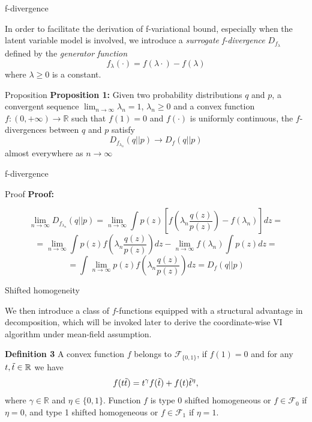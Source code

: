 \documentclass{beamer}
\begin{document}
\begin{frame}{f-divergence}
    \begin{block}{}
        In order to facilitate the derivation of f-variational bound, especially when the latent variable model is involved, we introduce a \textit{surrogate f-divergence} $D_{f_\lambda}$ defined by the \textit{generator function}
        \begin{equation}\label{f_lambda}
            f_\lambda(\cdot) = f(\lambda\cdot) - f(\lambda)
        \end{equation}
        where $\lambda \geqslant 0$ is a constant. 
    \end{block}
    \begin{block}{Proposition}
        \textbf{Proposition 1:} Given two probability distributions $q$ and $p$, a convergent sequence $\lim_{n\to\infty}\lambda_n = 1$, $\lambda_n \geqslant 0$ and a convex function $f: (0, +\infty) \rightarrow \mathbb{R}$ such that $f(1)=0$ and $f(\cdot)$ is uniformly continuous, the $f$-divergences between $q$ and $p$ satisfy
        \begin{equation}\label{prop1}
            D_{f_{\lambda_n}}(q||p) \rightarrow D_f(q||p)
        \end{equation}
        almost everywhere as $n\to\infty$
    \end{block}
\end{frame}

\begin{frame}{f-divergence}
    \begin{block}{Proof}
        \textbf{Proof:}

        $$\lim\limits_{n\to\infty}D_{f_{\lambda_n}}(q||p) = \lim\limits_{n\to\infty}\int p(z) \left[f\left(\lambda_n\dfrac{q(z)}{p(z)}\right) - f(\lambda_n)\right] dz =$$
        $$= \lim\limits_{n\to\infty}\int p(z) f\left(\lambda_n\dfrac{q(z)}{p(z)}\right)dz - \lim\limits_{n\to\infty}f(\lambda_n) \int p(z)dz =$$
        $$= \int \lim\limits_{n\to\infty} p(z) f\left(\lambda_n\dfrac{q(z)}{p(z)}\right)dz = D_f(q||p)$$
    \end{block}
\end{frame}

\begin{frame}{Shifted homogeneity}
    \begin{block}{}
        We then introduce a class of $f$-functions equipped with a structural advantage in decomposition, which will be invoked later to derive the coordinate-wise VI algorithm under mean-field assumption.

        \textbf{Definition 3} A convex function $f$ belongs to $\mathcal{F}_{\{0, 1\}}$, if $f(1)=0$ and for any $t, \Tilde{t} \in \mathbb{R}$ we have
        \begin{equation}\label{def3}
            f(t\Tilde{t}) = t^\gamma f(\Tilde{t}) + f(t)\Tilde{t}^\eta,
        \end{equation}
        where $\gamma\in\mathbb{R}$ and $\eta\in\{0, 1\}$. Function $f$ is type $0$ shifted homogeneous or $f \in \mathcal{F}_0$ if $\eta = 0$, and type 1 shifted homogeneous or $f \in \mathcal{F}_1$ if $\eta = 1$.
    \end{block}
\end{frame}
\end{document}
